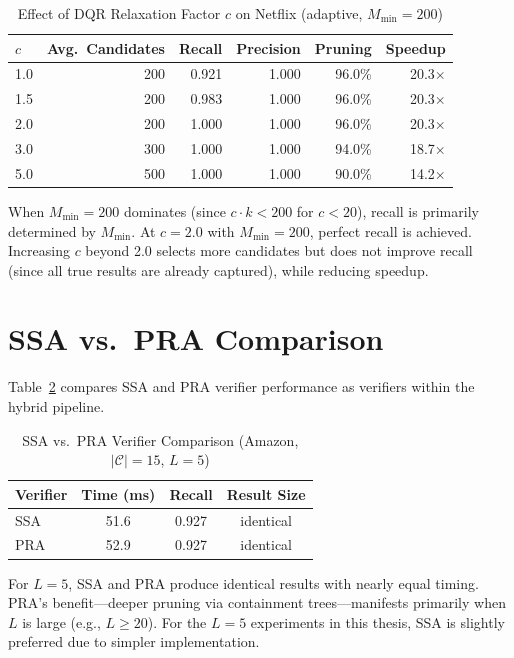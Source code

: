 \begin{table}[htbp]
\centering
\caption{Effect of DQR Relaxation Factor $c$ on Netflix (adaptive, $M_{\min}=200$)}
\label{tab:c_ablation}
\begin{tabular}{lrrrrr}
\toprule
$c$ & \textbf{Avg.\ Candidates} & \textbf{Recall} & \textbf{Precision} & \textbf{Pruning} & \textbf{Speedup} \\
\midrule
1.0 & 200 & 0.921 & 1.000 & 96.0\% & 20.3$\times$ \\
1.5 & 200 & 0.983 & 1.000 & 96.0\% & 20.3$\times$ \\
2.0 & 200 & 1.000 & 1.000 & 96.0\% & 20.3$\times$ \\
3.0 & 300 & 1.000 & 1.000 & 94.0\% & 18.7$\times$ \\
5.0 & 500 & 1.000 & 1.000 & 90.0\% & 14.2$\times$ \\
\bottomrule
\end{tabular}
\end{table}

When $M_{\min}=200$ dominates (since $c \cdot k < 200$ for $c < 20$), recall is primarily determined by $M_{\min}$. At $c = 2.0$ with $M_{\min}=200$, perfect recall is achieved. Increasing $c$ beyond 2.0 selects more candidates but does not improve recall (since all true results are already captured), while reducing speedup.

\section{SSA vs.\ PRA Comparison}

Table~\ref{tab:ssa_pra} compares SSA and PRA verifier performance as verifiers within the hybrid pipeline.

\begin{table}[htbp]
\centering
\caption{SSA vs.\ PRA Verifier Comparison (Amazon, $|\mathcal{C}|=15$, $L=5$)}
\label{tab:ssa_pra}
\begin{tabular}{lccc}
\toprule
\textbf{Verifier} & \textbf{Time (ms)} & \textbf{Recall} & \textbf{Result Size} \\
\midrule
SSA & 51.6 & 0.927 & identical \\
PRA & 52.9 & 0.927 & identical \\
\bottomrule
\end{tabular}
\end{table}

For $L = 5$, SSA and PRA produce identical results with nearly equal timing. PRA's benefit---deeper pruning via containment trees---manifests primarily when $L$ is large (e.g., $L \geq 20$). For the $L = 5$ experiments in this thesis, SSA is slightly preferred due to simpler implementation.

